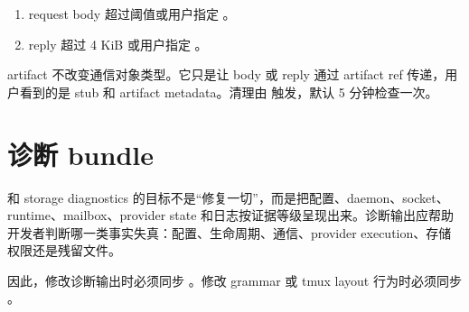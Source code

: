 \begin{enumerate}
  \item request body 超过阈值或用户指定 。
  \item reply 超过 4 KiB 或用户指定 。
\end{enumerate}

artifact 不改变通信对象类型。它只是让 body 或 reply 通过 artifact ref 传递，用户看到的是 stub 和 artifact metadata。清理由  触发，默认 5 分钟检查一次。

\section{诊断 bundle}

 和 storage diagnostics 的目标不是“修复一切”，而是把配置、daemon、socket、runtime、mailbox、provider state 和日志按证据等级呈现出来。诊断输出应帮助开发者判断哪一类事实失真：配置、生命周期、通信、provider execution、存储权限还是残留文件。

因此，修改诊断输出时必须同步 。修改  grammar 或 tmux layout 行为时必须同步 。
